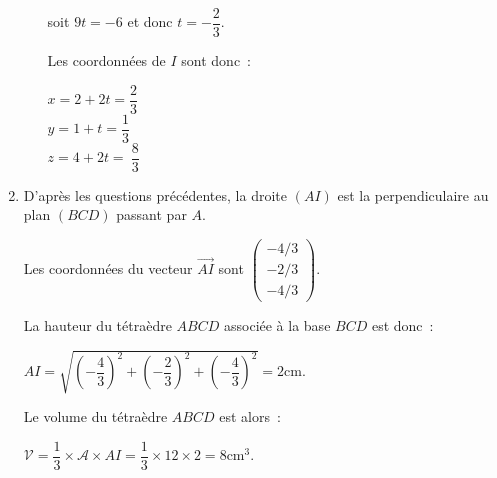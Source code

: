 \begin{corrige}
\begin{enumerate}
\begin{enumerate}[label=\alph*.]
               soit $9t=-6$ et donc $t=-\dfrac{2}{3}$.
               \par
               Les coordonnées de $I$ sont donc~:
               \par
               $x=2+2t=\dfrac{2}{3}$\\
               $y=1+t=\dfrac{1}{3}$\\
               $z=4+2t=~\dfrac{8}{3}$\\
          \end{enumerate}
          \item
          D'après les questions précédentes, la droite $(AI)$ est la perpendiculaire au plan $(BCD)$ passant par $A$.
          \par
          Les coordonnées du vecteur $\overrightarrow{AI}$ sont $\begin{pmatrix}-4/3\\-2/3\\-4/3\end{pmatrix}$.
          \par
          La hauteur du tétraèdre $ABCD$ associée à la base $BCD$ est donc~:
          \par
          $AI=\sqrt{\left(-\dfrac{4}{3} \right)^2+\left(-\dfrac{2}{3} \right)^2+\left(-\dfrac{4}{3} \right)^2}=2$cm.
          \par
          Le volume du tétraèdre $ABCD$ est alors~:
          \par
          $\mathscr{V}=\dfrac{1}{3} \times \mathscr{A} \times  AI =\dfrac{1}{3} \times 12 \times 2=8$cm$^3$.
     \end{enumerate}
\end{corrige}
\par
